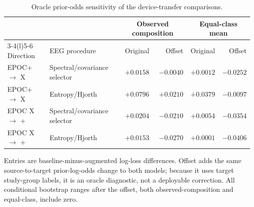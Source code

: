 \begin{table}[htbp]
\centering
\caption{Oracle prior-odds sensitivity of the device-transfer comparisons.}
\label{tab:offset}
\begin{tabularx}{\textwidth}{@{}l>{\raggedright\arraybackslash}Xrrrr@{}}
\toprule
& & \multicolumn{2}{c}{Observed composition} & \multicolumn{2}{c}{Equal-class mean} \\
\cmidrule(lr){3-4}\cmidrule(l){5-6}
Direction & EEG procedure & Original & Offset & Original & Offset \\
\midrule
EPOC+ $\to$ X & Spectral/covariance selector & $+0.0158$ & $-0.0040$ & $+0.0012$ & $-0.0252$ \\
EPOC+ $\to$ X & Entropy/Hjorth & $+0.0796$ & $+0.0210$ & $+0.0379$ & $-0.0097$ \\
EPOC X $\to$ + & Spectral/covariance selector & $+0.0204$ & $-0.0210$ & $+0.0054$ & $-0.0354$ \\
EPOC X $\to$ + & Entropy/Hjorth & $+0.0153$ & $-0.0270$ & $+0.0001$ & $-0.0406$ \\
\bottomrule
\end{tabularx}
\par\smallskip\begin{minipage}{\textwidth}
Entries are baseline-minus-augmented log-loss differences. Offset adds the same source-to-target prior-log-odds change to both models; because it uses target study-group labels, it is an oracle diagnostic, not a deployable correction. All conditional bootstrap ranges after the offset, both observed-composition and equal-class, include zero.
\end{minipage}
\end{table}
